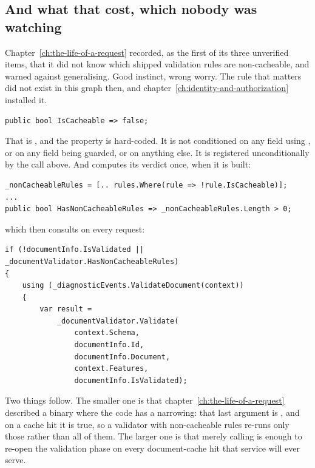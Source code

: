 \subsection*{And what that cost, which nobody was watching}

%
Chapter~\ref{ch:the-life-of-a-request} recorded, as the first of its three
unverified items, that it did not know which shipped validation rules are
non-cacheable, and warned against generalising. Good instinct, wrong worry. The
rule that matters did not exist in this graph then, and
chapter~\ref{ch:identity-and-authorization} installed it.

\begin{verbatim}
public bool IsCacheable => false;
\end{verbatim}

That is , and the property is hard-coded. It is
not conditioned on any field using , or on any field
being guarded, or on anything else. It is registered unconditionally by the call
above. And  computes its verdict once, when it is
built:

\begin{verbatim}
_nonCacheableRules = [.. rules.Where(rule => !rule.IsCacheable)];
...
public bool HasNonCacheableRules => _nonCacheableRules.Length > 0;
\end{verbatim}

which  then consults on every request:

\begin{verbatim}
if (!documentInfo.IsValidated || _documentValidator.HasNonCacheableRules)
{
    using (_diagnosticEvents.ValidateDocument(context))
    {
        var result =
            _documentValidator.Validate(
                context.Schema,
                documentInfo.Id,
                documentInfo.Document,
                context.Features,
                documentInfo.IsValidated);
\end{verbatim}

%
Two things follow. The smaller one is that
chapter~\ref{ch:the-life-of-a-request} described a binary where the code has a
narrowing: that last argument is , and on a cache hit it
is true, so a validator with non-cacheable rules re-runs only those rather than
all of them. The larger one is that merely calling  is
enough to re-open the validation phase on every document-cache hit that service
will ever serve.

